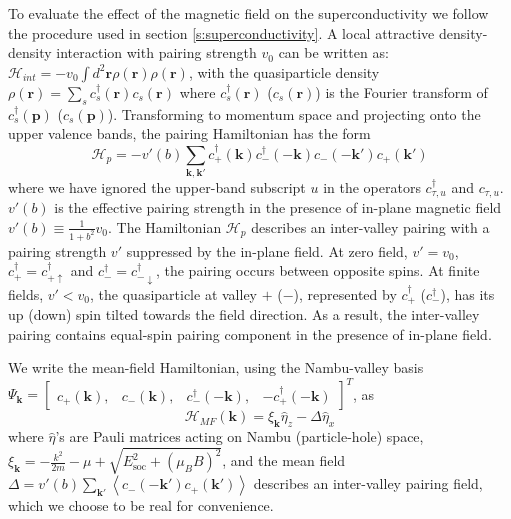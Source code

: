 To evaluate the effect of the magnetic field on the superconductivity we follow the procedure used in section \ref{s:superconductivity}.
A local attractive density-density
interaction with pairing strength $v_{0}$ can be written as: $\mathcal{H}_{int}=-v_{0}\int d^{2}\mathbf{r}\rho(\mathbf{r})\rho(\mathbf{r})$,
with the quasiparticle density $\rho(\mathbf{r})=\sum_{s}c_{s}^{\dagger}(\mathbf{r})c_{s}(\mathbf{r})$
where $c_{s}^{\dagger}(\mathbf{r})$ ($c_{s}(\mathbf{r})$) is the
Fourier transform of $c_{s}^{\dagger}(\mathbf{p})$ ($c_{s}(\mathbf{p})$).
Transforming to momentum space and projecting onto the upper valence
bands, the pairing Hamiltonian has the form
\begin{equation}
\mathcal{H}_{p}=-v'(b)\sum_{\mathbf{k},\mathbf{k}'}c_{+}^{\dagger}(\mathbf{k})c_{-}^{\dagger}(-\mathbf{k})c_{-}(-\mathbf{k}')c_{+}(\mathbf{k}')\label{eq: pairing_Hamiltonian}
\end{equation}
where we have ignored the upper-band subscript $u$ in the operators
$c_{\tau,u}^{\dagger}$ and $c_{\tau,u}$.
$v'(b)$ is the effective
pairing strength in the presence of in-plane magnetic field $v'(b)\equiv\frac{1}{1+b^{2}}v_{0}$.
The Hamiltonian $\mathcal{H}_{p}$ describes an inter-valley pairing
with a pairing strength $v'$ suppressed by the in-plane field.
At zero field, $v'=v_{0}$, $c_{+}^{\dagger}=c_{+\uparrow}^{\dagger}$ and
$c_{-}^{\dagger}=c_{-\downarrow}^{\dagger}$, the pairing occurs between
opposite spins.
At finite fields, $v'<v_{0}$, the quasiparticle at valley
$+$ ($-$), represented by $c_{+}^{\dagger}$ ($c_{-}^{\dagger}$),
has its up (down) spin tilted towards the field direction.
As a result, the inter-valley pairing contains equal-spin pairing component in
the presence of in-plane field.

We write the mean-field Hamiltonian, using the Nambu-valley basis
$\Psi_{\mathbf{k}}=\left[\begin{array}{cccc}
c_{+}(\mathbf{k}), & c_{-}(\mathbf{k}), & c_{-}^{\dagger}(-\mathbf{k}), & -c_{+}^{\dagger}(-\mathbf{k})\end{array}\right]^{T}$, as
\begin{equation}
\mathcal{H}_{MF}(\mathbf{k})=\xi_{\mathbf{k}}\hat{\eta}_{z}-\Delta\hat{\eta}_{x}\label{eq: Mean_Field_Hamiltonian}
\end{equation}
where $\hat{\eta}$'s are Pauli matrices acting on Nambu (particle-hole)
space, $\xi_{\mathbf{k}}=-\frac{k^{2}}{2m}-\mu+\sqrt{E_{\text{soc}}^{2}+\left(\mu_{B}B\right)^{2}}$,
and the mean field $\Delta=v'(b)\sum_{\mathbf{k}'}\left\langle c_{-}(-\mathbf{k}')c_{+}(\mathbf{k}')\right\rangle $
describes an inter-valley pairing field, which we choose to be real
for convenience.

